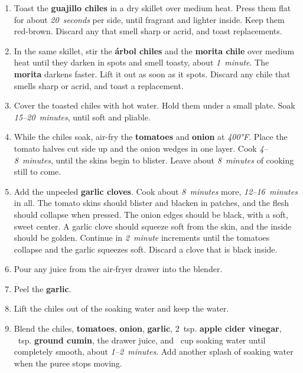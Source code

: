 \documentclass[11pt,letterpaper]{article}
\begin{document}
\begin{enumerate}
    \item Toast the \textbf{guajillo chiles} in a dry skillet over medium heat. Press them flat for about \textit{20~seconds} per side, until fragrant and lighter inside. Keep them red-brown. Discard any that smell sharp or acrid, and toast replacements.

    \item In the same skillet, stir the \textbf{árbol chiles} and the \textbf{morita chile} over medium heat until they darken in spots and smell toasty, about \textit{1~minute}. The \textbf{morita} darkens faster. Lift it out as soon as it spots. Discard any chile that smells sharp or acrid, and toast a replacement.

    \item Cover the toasted chiles with hot water. Hold them under a small plate. Soak \textit{15--20~minutes}, until soft and pliable.

    \item While the chiles soak, air-fry the \textbf{tomatoes} and \textbf{onion} at \textit{400°F}. Place the tomato halves cut side up and the onion wedges in one layer. Cook \textit{4--8~minutes}, until the skins begin to blister. Leave about \textit{8~minutes} of cooking still to come.

    \item Add the unpeeled \textbf{garlic cloves}. Cook about \textit{8~minutes} more, \textit{12--16~minutes} in all. The tomato skins should blister and blacken in patches, and the flesh should collapse when pressed. The onion edges should be black, with a soft, sweet center. A garlic clove should squeeze soft from the skin, and the inside should be golden. Continue in \textit{2~minute} increments until the tomatoes collapse and the garlic squeezes soft. Discard a clove that is black inside.

    \item Pour any juice from the air-fryer drawer into the blender.

    \item Peel the \textbf{garlic}.

    \item Lift the chiles out of the soaking water and keep the water.

    \item Blend the chiles, \textbf{tomatoes}, \textbf{onion}, \textbf{garlic}, 2~tsp. \textbf{apple cider vinegar}, ~tsp. \textbf{ground cumin}, the drawer juice, and ~cup soaking water until completely smooth, about \textit{1--2~minutes}. Add another splash of soaking water when the puree stops moving.


\end{enumerate}
\end{document}
